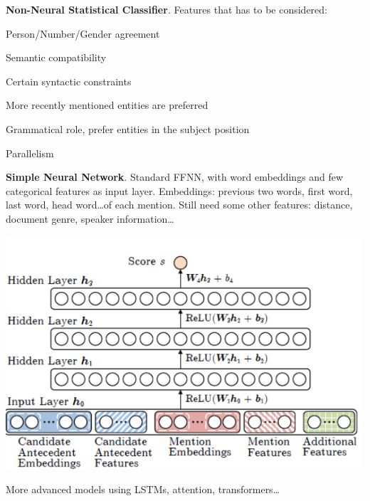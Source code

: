\documentclass[10pt]{report}
\begin{document}
\begin{list}{}{}
	\item \textbf{Non-Neural Statistical Classifier}. Features that has to be considered:
	\begin{list}{}{}
		\item Person/Number/Gender agreement
		\item Semantic compatibility
		\item Certain syntactic constraints
		\item More recently mentioned entities are preferred
		\item Grammatical role, prefer entities in the subject position
		\item Parallelism
	\end{list}
	\item \textbf{Simple Neural Network}. Standard FFNN, with word embeddings and few categorical features as input layer.
	Embeddings: previous two words, first word, last word, head word\ldots of each mention. Still need some other features: distance, document genre, speaker information\ldots
	\begin{center}
		\includegraphics[scale=0.5]{112.png}
	\end{center}
	\item More advanced models using LSTMs, attention, transformers\ldots
\end{list}
\end{document}
